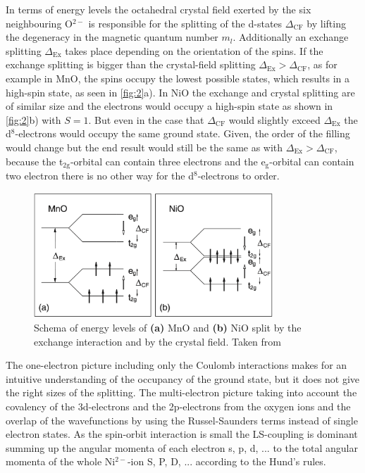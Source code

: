 In terms of energy levels the octahedral crystal field exerted by the six neighbouring O$^{2-}$ is responsible for the splitting of the d-states $\Delta_{\text{CF}}$ by lifting the degeneracy in the magnetic quantum number $m_l$.
Additionally an exchange splitting $\Delta_{\text{Ex}}$ takes place depending on the orientation of the spins.
If the exchange splitting is bigger than the crystal-field splitting $\Delta_{\text{Ex}} > \Delta_{\text{CF}}$, as for example in MnO, the spins occupy the lowest possible states, which results in a high-spin state, as seen in \autoref{fig:2}a).
In NiO the exchange and crystal splitting are of similar size and the electrons would occupy a high-spin state as shown in \autoref{fig:2}b) with $S=1$. But even in the case that $\Delta_{\text{CF}}$ would slightly exceed $\Delta_{\text{Ex}}$ the d$^8$-electrons would occupy the same ground state.
Given, the order of the filling would change but the end result would still be the same as with $\Delta_{\text{Ex}} > \Delta_{\text{CF}}$, because the t$_{\text{2g}}$-orbital can contain three electrons and the e$_{\text{g}}$-orbital can contain two electron there is no other way for the d$^8$-electrons to order.
\begin{figure}[ht]
    \centering
    \includegraphics[width=0.8\textwidth]{pictures/2.png}
    \caption{Schema of energy levels of \textbf{(a)} MnO and \textbf{(b)} NiO split by the exchange interaction and by the crystal field. Taken from }
    \label{fig:2}
\end{figure}
\FloatBarrier
The one-electron picture including only the Coulomb interactions makes for an intuitive understanding of the occupancy of the ground state, but it does not give the right sizes of the splitting.
The multi-electron picture taking into account the covalency of the 3d-electrons and the 2p-electrons from the oxygen ions and the overlap of the wavefunctions by using the Russel-Saunders terms instead of single electron states.
As the spin-orbit interaction is small the LS-coupling is dominant summing up the angular momenta of each electron s, p, d, ... to the total angular momenta of the whole Ni$^{2-}$-ion S, P, D, ... according to the Hund's rules.
